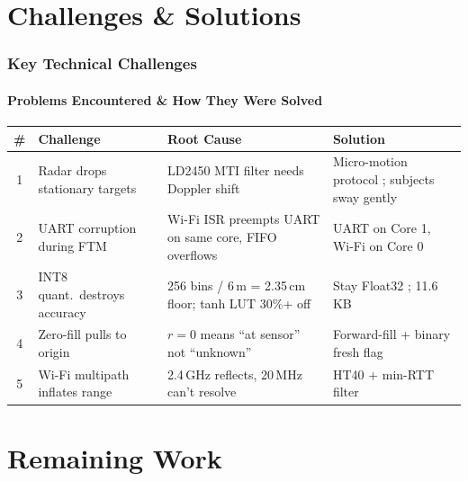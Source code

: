 \documentclass[
	11pt,
	aspectratio=169,
]{beamer}
\begin{document}

\section{Challenges \& Solutions}

\begin{frame}
	\frametitle{Key Technical Challenges}
	\framesubtitle{Problems Encountered \& How They Were Solved}

	\centering
	\scriptsize
	\begin{tabular}{c p{2.1cm} p{2.9cm} p{3.6cm}}
		\toprule
		\textbf{\#} & \textbf{Challenge} & \textbf{Root Cause} & \textbf{Solution} \\
		\midrule
		1 & Radar drops stationary targets & LD2450 MTI filter needs Doppler shift & Micro-motion protocol ; subjects sway gently \\[3pt]
		2 & UART corruption during FTM & Wi-Fi ISR preempts UART on same core, FIFO overflows & UART on Core 1, Wi-Fi on Core 0 \\[3pt]
		3 & INT8 quant.\ destroys accuracy & 256 bins / 6\,m = 2.35\,cm floor; tanh LUT 30\%+ off & Stay \alert{Float32} ; 11.6\,KB \\[3pt]
		4 & Zero-fill pulls to origin & $r{=}0$ means ``at sensor'' not ``unknown'' & \alert{Forward-fill} + binary fresh flag \\[3pt]
		5 & Wi-Fi multipath inflates range & 2.4\,GHz reflects, 20\,MHz can't resolve & \alert{HT40} + min-RTT filter \\
		\bottomrule
	\end{tabular}
\end{frame}


\section{Remaining Work}
\end{document}
